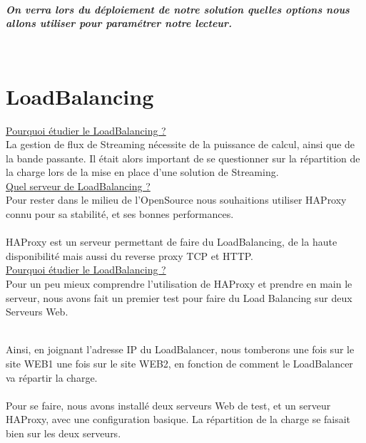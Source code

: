 \documentclass{report}
\begin{document}
    \\
    
    \begin{center}
    \textbf{\textit{ On verra lors du déploiement de notre solution quelles options nous allons utiliser pour paramétrer notre lecteur.}}
    \end{center}
    \\
    \hfill

    
    \section{LoadBalancing}  
    
    \underline{Pourquoi étudier le LoadBalancing ?}\\

    La gestion de flux de Streaming nécessite de la puissance de calcul, ainsi que de la bande passante. Il était alors important de se questionner sur la répartition de la charge lors de la mise en place d’une solution de Streaming.\\
    
    
    \underline{Quel serveur de LoadBalancing ?}\\
    
    Pour rester dans le milieu de l’OpenSource nous souhaitions utiliser HAProxy connu pour sa stabilité, et ses bonnes performances. 
    \\
    \\
    HAProxy est un serveur permettant de faire du LoadBalancing, de la haute disponibilité mais aussi du reverse proxy TCP et HTTP.\\
    
    \underline{Pourquoi étudier le LoadBalancing ?}\\
    
    
    Pour un peu mieux comprendre l’utilisation de HAProxy et prendre en main le serveur, nous avons fait un premier test pour faire du Load Balancing sur deux Serveurs Web.
    \\
    \\
    
    \hfill
    
    Ainsi, en joignant l’adresse IP du LoadBalancer, nous tomberons une fois sur le site WEB1 une fois sur le site WEB2, en fonction de comment le LoadBalancer va répartir la charge.
    \\
    \\
    Pour se faire, nous avons installé deux serveurs Web de test, et un serveur HAProxy, avec une configuration basique. La répartition de la charge se faisait bien sur les deux serveurs.
    \\
    \\
\end{document}
